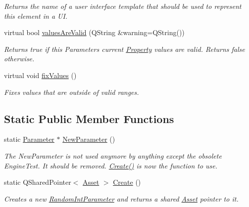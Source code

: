 \begin{DoxyCompactItemize}
\begin{DoxyCompactList}\small\item\em Returns the name of a user interface template that should be used to represent this element in a U\-I. \end{DoxyCompactList}\item 
virtual bool \hyperlink{class_picto_1_1_random_int_parameter_a39e02e865ab6fe381dac174ed7c38120}{values\-Are\-Valid} (Q\-String \&warning=Q\-String())
\begin{DoxyCompactList}\small\item\em Returns true if this Parameters current \hyperlink{class_picto_1_1_property}{Property} values are valid. Returns false otherwise. \end{DoxyCompactList}\item 
virtual void \hyperlink{class_picto_1_1_random_int_parameter_a13544a1fc74f41eccda2d0550a94b6e7}{fix\-Values} ()
\begin{DoxyCompactList}\small\item\em Fixes values that are outside of valid ranges. \end{DoxyCompactList}\end{DoxyCompactItemize}
\subsection*{Static Public Member Functions}
\begin{DoxyCompactItemize}
\item 
\hypertarget{class_picto_1_1_random_int_parameter_af433955567ec9242d808b3da70fc0f6b}{static \hyperlink{class_picto_1_1_parameter}{Parameter} $\ast$ \hyperlink{class_picto_1_1_random_int_parameter_af433955567ec9242d808b3da70fc0f6b}{New\-Parameter} ()}\label{class_picto_1_1_random_int_parameter_af433955567ec9242d808b3da70fc0f6b}

\begin{DoxyCompactList}\small\item\em The New\-Parameter is not used anymore by anything except the obsolete Engine\-Test. It should be removed. \hyperlink{class_picto_1_1_random_int_parameter_a270b11be45adc082ac5ddc06249f3735}{Create()} is now the function to use. \end{DoxyCompactList}\item 
\hypertarget{class_picto_1_1_random_int_parameter_a270b11be45adc082ac5ddc06249f3735}{static Q\-Shared\-Pointer$<$ \hyperlink{class_picto_1_1_asset}{Asset} $>$ \hyperlink{class_picto_1_1_random_int_parameter_a270b11be45adc082ac5ddc06249f3735}{Create} ()}\label{class_picto_1_1_random_int_parameter_a270b11be45adc082ac5ddc06249f3735}

\begin{DoxyCompactList}\small\item\em Creates a new \hyperlink{class_picto_1_1_random_int_parameter}{Random\-Int\-Parameter} and returns a shared \hyperlink{class_picto_1_1_asset}{Asset} pointer to it. \end{DoxyCompactList}\end{DoxyCompactItemize}
